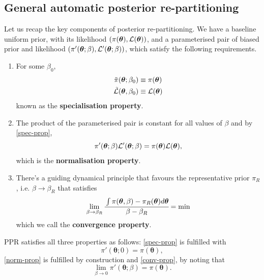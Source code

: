 \documentclass[usenatbib]{mnras}
\begin{document}
\subsection{General automatic posterior re-partitioning}
\label{sec:org4acaf53}

Let us recap the key components of posterior re-partitioning. We
have a baseline uniform prior, with its likelihood \((\pi(\bm{\theta}),
   \cal L (\bm{\theta}))\), and a parameterised pair of biased prior and
likelihood \((\pi'(\bm{\theta}; \beta), \cal L' (\bm{\theta}; \beta))\), which
satisfy the following requirements.

\begin{enumerate}
\item For some \(\beta_{0}\), 
\begin{subequations}
\begin{align}
\tilde{\pi}(\bm{\theta}; \beta_{0}) &\equiv \pi(\bm{\theta}) \\
\tilde{\cal L}(\bm{\theta}, \beta_{0}) &\equiv {\cal L}(\bm{\theta})
\end{align}
\end{subequations}
known as the \textbf{\textbf{specialisation property}}.\label{spec-prop}
\item The product of the parameterised pair is constant for all values
of \(\beta\) and by \ref{spec-prop}, 
\begin{equation*} 
\pi'(\bm{\theta}; \beta) \cal L'(\bm{\theta}; \beta) = \pi(\bm{\theta}) \cal L (\bm{\theta}),
\end{equation*}
which is the \textbf{\textbf{normalisation property}}.\label{norm-prop}
\item There's a guiding dynamical principle that favours the
representative prior \(\pi_{R}\), i.e. \(\beta\rightarrow\beta_{R}\)
that satisfies
\begin{equation*}
  \lim_{\beta\rightarrow\beta_{R}}\cfrac{\int \pi(\bm{\theta}, \beta) - \pi_{R}(\bm{\theta}) d\bm{\theta}}{\beta - \beta_{R}} = \min
\end{equation*}
which we call the \textbf{\textbf{convergence property}}.\label{conv-prop}
\end{enumerate}

PPR satisfies all three properties as follows: \ref{spec-prop} is
fulfilled with \[\pi'(\bm{\theta}; 0) =\pi(\bm{\theta}),\] \ref{norm-prop} is
fulfilled by construction and \ref{conv-prop}, by noting that
\[\lim_{\beta \rightarrow 0} \pi'(\bm{\theta}; \beta) = \pi(\bm{\theta}).\]
\end{document}
